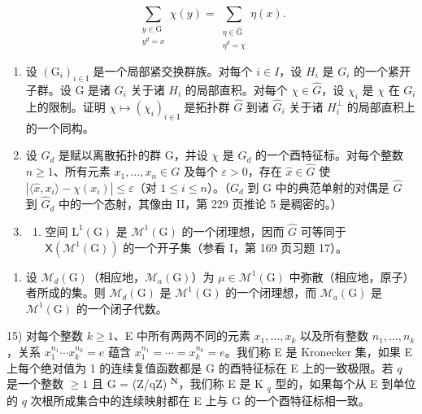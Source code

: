 \[
\sum_{\substack{y\in \mathrm{G}\\ y^{d} = x}}\chi (y) = \sum_{\substack{\eta \in \widehat{\mathrm{G}}\\ \eta^{d} = \chi}}\eta (x).
\]

\begin{enumerate}
\def\labelenumi{\arabic{enumi})}
\setcounter{enumi}{11}
\item
  设 \((\mathrm{G}_{i})_{i\in\mathrm{I}}\) 是一个局部紧交换群族。对每个 \(i\in I\)，设 \(H_{i}\) 是 \(G_{i}\) 的一个紧开子群。设 G 是诸 \(G_{i}\) 关于诸 \(H_{i}\) 的局部直积。对每个 \(\chi\in\widehat{G}\)，设 \(\chi_{i}\) 是 \(\chi\) 在 \(G_{i}\) 上的限制。证明 \(\chi\mapsto(\chi_{i})_{i\in\mathrm{I}}\) 是拓扑群 \(\widehat{G}\) 到诸 \(\widehat{G}_{i}\) 关于诸 \(H_{i}^{\perp}\) 的局部直积上的一个同构。
\item
  设 \(G_{d}\) 是赋以离散拓扑的群 G，并设 \(\chi\) 是 \(G_{d}\) 的一个酉特征标。对每个整数 \(n \geqslant 1\)、所有元素 \(x_{1}, \ldots, x_{n} \in G\) 及每个 \(\varepsilon > 0\)，存在 \(\widehat{x} \in \widehat{G}\) 使 \(|\langle\widehat{x}, x_{i}\rangle - \chi(x_{i})| \leqslant \varepsilon\)（对 \(1 \leqslant i \leqslant n\)）。（\(G_{d}\) 到 G 中的典范单射的对偶是 \(\widehat{G}\) 到 \(\widehat{G}_{d}\) 中的一个态射，其像由 II，第 229 页推论 5 是稠密的。）
\item
  \begin{enumerate}
  \def\labelenumii{\alph{enumii})}
  \tightlist
  \item
    空间 \(\mathrm{L}^{1}(\mathrm{G})\) 是 \(\mathcal{M}^{1}(\mathrm{G})\) 的一个闭理想，因而 \(\widehat{G}\) 可等同于 \(\mathsf{X}(\mathcal{M}^{1}(\mathrm{G}))\) 的一个开子集（参看 I，第 169 页习题 17）。
  \end{enumerate}
\end{enumerate}

\begin{enumerate}
\def\labelenumi{\alph{enumi})}
\setcounter{enumi}{1}
\tightlist
\item
  设 \(\mathcal{M}_{d}(\mathrm{G})\)（相应地，\(\mathcal{M}_{a}(\mathrm{G})\)）为 \(\mu\in\mathcal{M}^{1}(\mathrm{G})\) 中弥散（相应地，原子）者所成的集。则 \(\mathcal{M}_{d}(\mathrm{G})\) 是 \(\mathcal{M}^{1}(\mathrm{G})\) 的一个闭理想，而 \(\mathcal{M}_{a}(\mathrm{G})\) 是 \(\mathcal{M}^{1}(\mathrm{G})\) 的一个闭子代数。
\end{enumerate}

15) 对每个整数 \(k \geqslant 1\)、E 中所有两两不同的元素 \(x_1, \ldots, x_k\) 以及所有整数 \(n_1, \ldots, n_k\)，关系 \(x_1^{n_1} \cdots x_k^{n_k} = e\) 蕴含 \(x_1^{n_1} = \cdots = x_k^{n_k} = e\)。我们称 E 是 Kronecker 集，如果 E 上每个绝对值为 1 的连续复值函数都是 G 的酉特征标在 E 上的一致极限。若 \(q\) 是一个整数 \(\geqslant 1\) 且 G = (Z/qZ) \(^{\mathbf{N}}\)，我们称 E 是 K \(_q\) 型的，如果每个从 E 到单位的 \(q\) 次根所成集合中的连续映射都在 E 上与 G 的一个酉特征标相一致。

